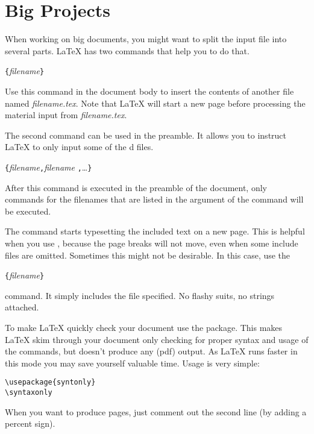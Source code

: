 %
%

\section{Big Projects}
When working on big documents, you might want to split the input file
into several parts. \LaTeX{} has two commands that help you to do
that.

\begin{lscommand}
  \verb|{|\emph{filename}\verb|}|
\end{lscommand}
\noindent Use this command in the document body to insert the
contents of another file named \emph{filename.tex}. Note that \LaTeX{}
will start a new page
before processing the material input from \emph{filename.tex}.

The second command can be used in the preamble. It allows you to
instruct \LaTeX{} to only input some of the \verb||d files.
\begin{lscommand}
  \verb|{|\emph{filename}\verb|,|\emph{filename}%
  \verb|,|\ldots\verb|}|
\end{lscommand}
After this command is executed in the preamble of the document, only
 commands for the filenames that are listed in the
argument of the  command will be executed.

The  command starts typesetting the included text on a new
page. This is helpful when you use , because the
page breaks will not move, even when some include files are omitted.
Sometimes this might not be desirable. In this case, use the
\begin{lscommand}
  \verb|{|\emph{filename}\verb|}|
\end{lscommand}
\noindent command. It simply includes the file specified.
No flashy suits, no strings attached.


To make \LaTeX{} quickly check your document use the 
package. This makes \LaTeX{} skim through your document only checking for
proper syntax and usage of the commands, but doesn't produce any (pdf) output.
As \LaTeX{} runs faster in this mode you may save yourself valuable time.
Usage is very simple:

\begin{verbatim}
\usepackage{syntonly}
\syntaxonly
\end{verbatim}
When you want to produce pages, just comment out the second line
(by adding a percent sign).


%


